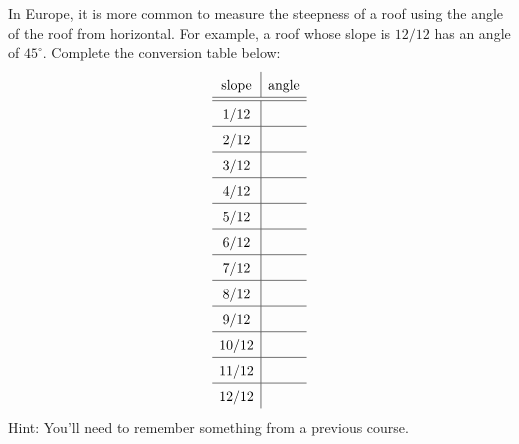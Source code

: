 \begin{prob}
In Europe, it is more common to measure the steepness of a roof using
the angle of the roof from horizontal. For example, a roof whose
slope is $12/12$ has an angle of $45^\circ$. Complete the conversion table below:
\[
{\renewcommand{\arraystretch}{1.5}
\begin{array}{c|c}
\text{slope} & \text{angle} \\ \hline\hline
1/12 &  \\ \hline
2/12 &  \\ \hline
3/12 &  \\ \hline
4/12 &  \\ \hline
5/12 &  \\ \hline
6/12 &  \\ \hline
7/12 &  \\ \hline
8/12 &  \\ \hline
9/12 &  \\ \hline
10/12 &  \\ \hline
11/12 &  \\ \hline
12/12 & 
\end{array}}
\]
Hint: You'll need to remember something from a previous course.
\end{prob}


